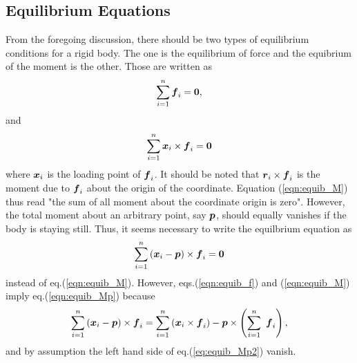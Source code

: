 \documentclass[10pt,a4j]{article}
\begin{document}
\subsection{Equilibrium Equations}
From the foregoing discussion, there should be two types of equilibrium conditions
for a rigid body. The one is the equilibrium of force and the equibrium of the 
moment is the other. Those are written as 
\begin{equation}
	\sum_{i=1}^n \mbox{\boldmath $f$}_i = \mbox{\boldmath $0$}, 
	\label{eqn:equib_f}
\end{equation}
and 
\begin{equation}
	\sum_{i=1}^n \mbox{\boldmath $x$}_i\times \mbox{\boldmath $f$}_i
	=
	\mbox{\boldmath $0$}
	\label{eqn:equib_M}
\end{equation}
where $\mbox{\boldmath $x$}_i$ is the loading point of $\mbox{\boldmath $f$}_i$.
It should be noted that $\mbox{\boldmath $r$}_i \times \mbox{\boldmath $f$}_i$ is the moment 
due to $\mbox{\boldmath $f$}_i$ about the origin of the coordinate. 
Equation (\ref{eqn:equib_M}) thus read 
"the sum of all moment about the coordinate origin is zero".
However, the total moment about an arbitrary point, say $\mbox{\boldmath $p$}$, 
should equally vanishes if the body is staying still. 
Thus, it seems necessary to write the equilbrium equation as 
\begin{equation}
	\sum_{i=1}^n \left(\mbox{\boldmath $x$}_i-\mbox{\boldmath $p$}\right) \times \mbox{\boldmath $f$}_i = \mbox{\boldmath $0$}
	\label{eqn:equib_Mp}
\end{equation}
instead of eq.(\ref{eqn:equib_M}).
However, eqs.(\ref{eqn:equib_f}) and (\ref{eqn:equib_M}) imply eq.(\ref{eqn:equib_Mp})
because 
\begin{equation}
	\sum_{i=1}^n \left(\mbox{\boldmath $x$}_i-\mbox{\boldmath $p$}\right) \times \mbox{\boldmath $f$}_i
	=
	\sum_{i=1}^n \left( \mbox{\boldmath $x$}_i\times \mbox{\boldmath $f$}_i  \right)
	- 
	\mbox{\boldmath $p$} \times \left(\sum_{i=1}^n \ \mbox{\boldmath $f$}_i \right), 
	\label{eqn:equib_Mp2}
\end{equation}
and by assumption the left hand side of eq.(\ref{eq:equib_Mp2}) vanish.
\end{document}
